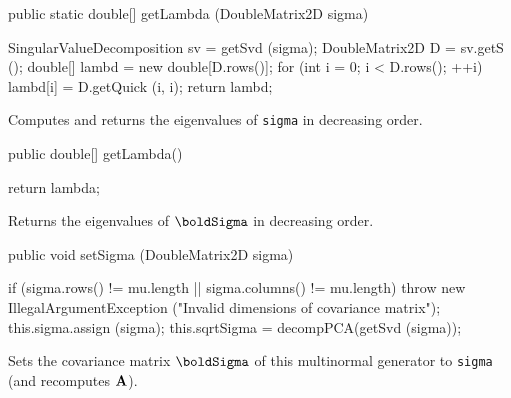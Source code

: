 \begin{code}

   public static double[] getLambda (DoubleMatrix2D sigma)\begin{hide} {
      SingularValueDecomposition sv = getSvd (sigma);
      DoubleMatrix2D D = sv.getS ();
      double[] lambd = new double[D.rows()];
      for (int i = 0; i < D.rows(); ++i)
         lambd[i] = D.getQuick (i, i);
      return lambd;
   }\end{hide}
\end{code}
\begin{tabb} Computes and returns the eigenvalues of \texttt{sigma} in
 decreasing order.
\end{tabb}
\begin{code}

   public double[] getLambda()\begin{hide} {
      return lambda;
   }\end{hide}
\end{code}
\begin{tabb} Returns the eigenvalues of $\boldSigma$ in decreasing order.
\end{tabb}
\begin{code}

   public void setSigma (DoubleMatrix2D sigma)\begin{hide} {
      if (sigma.rows() != mu.length || sigma.columns() != mu.length)
         throw new IllegalArgumentException
            ("Invalid dimensions of covariance matrix");
      this.sigma.assign (sigma);
      this.sqrtSigma = decompPCA(getSvd (sigma));
   }\end{hide}
\end{code}
\begin{tabb} Sets the covariance matrix $\bSigma$ of this multinormal generator
 to \texttt{sigma} (and recomputes $\textbf{A}$).
\end{tabb}
\begin{htmlonly}
\end{htmlonly}
